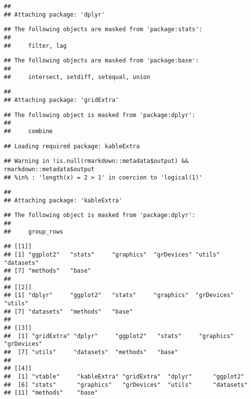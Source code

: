 \documentclass[
]{article}
\begin{document}
\begin{verbatim}
## 
## Attaching package: 'dplyr'
\end{verbatim}

\begin{verbatim}
## The following objects are masked from 'package:stats':
## 
##     filter, lag
\end{verbatim}

\begin{verbatim}
## The following objects are masked from 'package:base':
## 
##     intersect, setdiff, setequal, union
\end{verbatim}

\begin{verbatim}
## 
## Attaching package: 'gridExtra'
\end{verbatim}

\begin{verbatim}
## The following object is masked from 'package:dplyr':
## 
##     combine
\end{verbatim}

\begin{verbatim}
## Loading required package: kableExtra
\end{verbatim}

\begin{verbatim}
## Warning in !is.null(rmarkdown::metadata$output) && rmarkdown::metadata$output
## %in% : 'length(x) = 2 > 1' in coercion to 'logical(1)'
\end{verbatim}

\begin{verbatim}
## 
## Attaching package: 'kableExtra'
\end{verbatim}

\begin{verbatim}
## The following object is masked from 'package:dplyr':
## 
##     group_rows
\end{verbatim}

\begin{verbatim}
## [[1]]
## [1] "ggplot2"   "stats"     "graphics"  "grDevices" "utils"     "datasets" 
## [7] "methods"   "base"     
## 
## [[2]]
## [1] "dplyr"     "ggplot2"   "stats"     "graphics"  "grDevices" "utils"    
## [7] "datasets"  "methods"   "base"     
## 
## [[3]]
##  [1] "gridExtra" "dplyr"     "ggplot2"   "stats"     "graphics"  "grDevices"
##  [7] "utils"     "datasets"  "methods"   "base"     
## 
## [[4]]
##  [1] "vtable"     "kableExtra" "gridExtra"  "dplyr"      "ggplot2"   
##  [6] "stats"      "graphics"   "grDevices"  "utils"      "datasets"  
## [11] "methods"    "base"
\end{verbatim}
\end{document}
